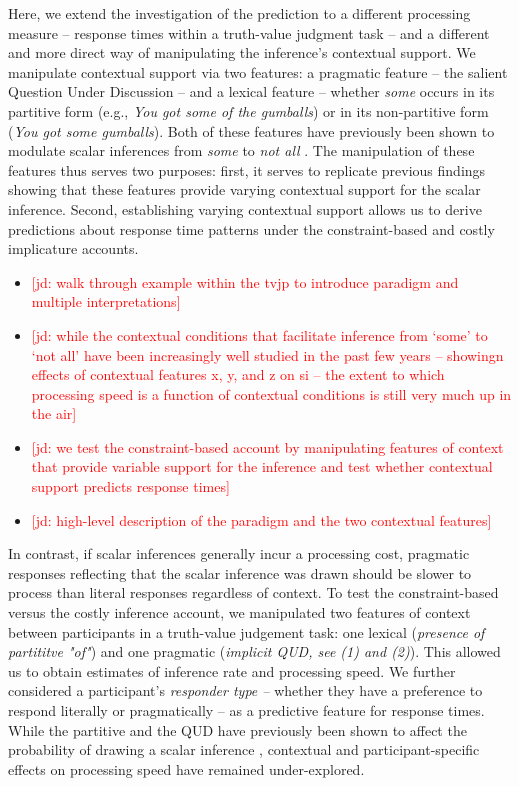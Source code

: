\documentclass[10pt,letterpaper]{article}
\newcommand{\jd}[1]{\textcolor{Red}{[jd: #1]}}
\begin{document}
Here, we extend the investigation of the prediction to a different processing measure -- response times within a truth-value judgment task -- and a different and more direct way of manipulating the inference's contextual support. We manipulate contextual support via two features: a pragmatic feature -- the salient Question Under Discussion \cite<QUD, >{Roberts2012} -- and a lexical feature -- whether  \emph{some} occurs in its partitive form (e.g., \emph{You got some of the gumballs}) or in its non-partitive form (\emph{You got some gumballs}). Both of these features have previously been shown to modulate scalar inferences from \emph{some} to \emph{not all} \cite{Zondervan2010, DegenGoodman2014, Degen2015, DegenTanenhaus2015}. The manipulation of these features thus serves two purposes: first, it serves to replicate previous findings showing that these features provide varying contextual support for the scalar inference. Second, establishing varying contextual support allows us to derive predictions about response time patterns under the constraint-based and costly implicature accounts.

\begin{itemize}
	\item \jd{walk through example within the tvjp to introduce paradigm and multiple interpretations}
	\item \jd{while the contextual conditions that facilitate inference from `some' to `not all' have been increasingly well studied in the past few years -- showingn effects of contextual features x, y, and z on si -- the extent to which processing speed is a function of contextual conditions is still very much up in the air}
	\item \jd{we test the constraint-based account by manipulating features of context that provide variable support for the inference and test whether contextual support predicts response times}
	\item \jd{high-level description of the paradigm and the two contextual features}
\end{itemize}


 In contrast, if scalar inferences generally incur a processing cost, pragmatic responses reflecting that the scalar inference was drawn should be slower to process than literal responses regardless of context. To test the constraint-based versus the costly inference account, we manipulated two features of context between participants in a truth-value judgement task: one lexical (\textit{presence of partititve "of"}) and one pragmatic (\textit{implicit QUD, see (1) and (2)}). This allowed us to obtain estimates of inference rate and processing speed. We further considered a participant’s \textit{responder type  --} whether they have a preference to respond literally or pragmatically -- as a predictive feature for response times. While the partitive and the QUD have previously been shown to affect the probability of drawing a scalar inference \cite{Zondervan2010,Degen2015,DegenGoodman2014,DegenTanenhaus2015}, contextual and participant-specific effects on processing speed have remained under-explored.
\end{document}

